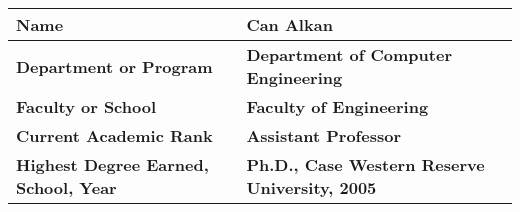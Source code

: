 \begin{center}
\begin{tabular}{|l|l|}
  \hline
  {\bf Name} & {\bf Can Alkan } \\
  \hline
  {\bf Department or Program} & {\bf Department of Computer Engineering} \\
  \hline
  {\bf Faculty or School} & {\bf Faculty of Engineering} \\
  \hline
  {\bf Current Academic Rank} & {\bf Assistant Professor } \\
  \hline
  {\bf Highest Degree Earned, School, Year} & {\bf Ph.D., Case Western Reserve University, 2005} \\
  \hline
\end{tabular}

\end{center}
